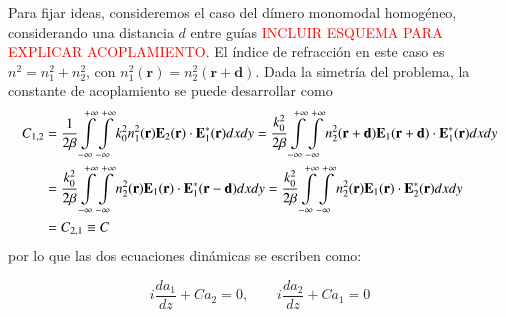 Para fijar ideas, consideremos el caso del dímero monomodal homogéneo, considerando una distancia $d$ entre guías \textcolor{red}{INCLUIR ESQUEMA PARA EXPLICAR ACOPLAMIENTO}. El índice de refracción en este caso es $n^2 = n_1^2 + n_2^2$, con $n_1^2(\textbf{r})=n_2^2(\textbf{r}+\textbf{d})$. Dada la simetría del problema, la constante de acoplamiento se puede desarrollar como 
\begin{align}
	C_{1, 2} &=  \frac{1}{2\beta}\int\displaylimits_{-\infty}^{+\infty}\int\displaylimits_{-\infty}^{+\infty} k_0^2 n_1^2(\textbf{r}) \textbf{E}_{2}(\textbf{r}) \cdot \textbf{E}_{1}^*(\textbf{r}) dxdy 
	= \frac{k_0^2}{2\beta}\int\displaylimits_{-\infty}^{+\infty}\int\displaylimits_{-\infty}^{+\infty}  n_2^2(\textbf{r}+\textbf{d}) \textbf{E}_{1}(\textbf{r}+\textbf{d}) \cdot \textbf{E}_{1}^*(\textbf{r}) dxdy 
	\nonumber	
	\\	
	&= \frac{k_0^2}{2\beta}\int\displaylimits_{-\infty}^{+\infty}\int\displaylimits_{-\infty}^{+\infty} n_2^2(\textbf{r}) \textbf{E}_{1}(\textbf{r}) \cdot \textbf{E}_{1}^*(\textbf{r}-\textbf{d}) dxdy 
	= \frac{k_0^2}{2\beta}\int\displaylimits_{-\infty}^{+\infty}\int\displaylimits_{-\infty}^{+\infty} n_2^2(\textbf{r}) \textbf{E}_{1}(\textbf{r}) \cdot \textbf{E}_{2}^*(\textbf{r}) dxdy 
	\nonumber
	\\	
	&= C_{2,1} \equiv C
	\nonumber
\end{align}
 por lo que las dos ecuaciones dinámicas se escriben como:

\begin{equation}
	i\frac{d a_1}{dz} + C a_2 = 0, \quad\quad i\frac{d a_2}{dz} + C a_1 = 0 \nonumber
\end{equation}


	
